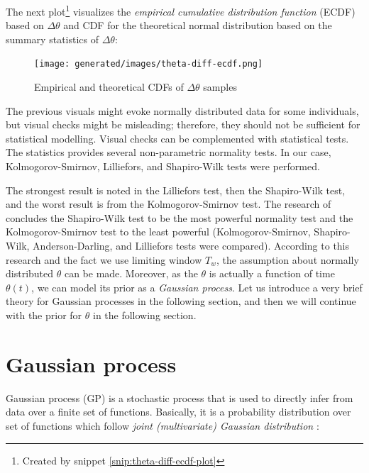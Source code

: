 \documentclass[
  digital, %
  oneside, %
  lof,     %
  lot,     %
]{fithesis4}
\begin{document}
The next plot\footnote{Created by snippet \ref{snip:theta-diff-ecdf-plot}} visualizes the \textit{empirical cumulative distribution function} (ECDF) based on $\Delta \theta$ and CDF for the theoretical normal distribution based on the summary statistics of $\Delta \theta$:

\begin{figure}[H]
  \begin{center}
    \texttt{[image: generated/images/theta-diff-ecdf.png]}
  \end{center}
  \caption{Empirical and theoretical CDFs of $\Delta \theta$ samples}
  \label{fig:theta-diff-ecdf}
\end{figure}

The previous visuals might evoke normally distributed data for some individuals, but visual checks might be misleading; therefore, they should not be sufficient for statistical modelling.
Visual checks can be complemented with statistical tests.
The statistics provides several non-parametric normality tests.
In our case, Kolmogorov-Smirnov, Lilliefors, and Shapiro-Wilk tests were performed.





The strongest result is noted in the Lilliefors test, then the Shapiro-Wilk test, and the worst result is from the Kolmogorov-Smirnov test.
The research of \cite{razali2011} concludes the Shapiro-Wilk test to be the most powerful normality test and the Kolmogorov-Smirnov test to the least powerful (Kolmogorov-Smirnov, Shapiro-Wilk, Anderson-Darling, and Lilliefors tests were compared).
According to this research and the fact we use limiting window $T_w$, the assumption about normally distributed $\theta$ can be made.
Moreover, as the $\theta$ is actually a function of time $\theta(t)$, we can model its prior as a \textit{Gaussian process}.
Let us introduce a very brief theory for Gaussian processes in the following section, and then we will continue with the prior for $\theta$ in the following section.


\section{Gaussian process}

Gaussian process (GP) is a stochastic process that is used to directly infer from data over a finite set of functions.
Basically, it is a probability distribution over set of functions which follow \textit{joint (multivariate) Gaussian distribution} \cite{frigola2015}:
\end{document}
